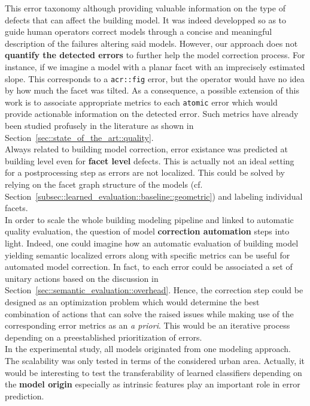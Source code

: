     This error taxonomy although providing valuable information on the type of defects that can affect the building model.
    It was indeed developped so as to guide human operators correct models through a concise and meaningful description of the failures altering said models.
    However, our approach does not \textbf{quantify the detected errors} to further help the model correction process.
    For instance, if we imagine a model with a planar facet with an imprecisely estimated slope.
    This corresponds to a \texttt{\acrfull{acr::fig}} error, but the operator would have no idea by how much the facet was tilted.
    As a consequence, a possible extension of this work is to associate appropriate metrics to each \texttt{atomic} error which would provide actionable information on the detected error.
    Such metrics have already been studied profusely in the literature as shown in Section~\ref{sec::state_of_the_art::quality}.\\

    Always related to building model correction, error existance was predicted at building level even for \textbf{facet level} defects.
    This is actually not an ideal setting for a postprocessing step as errors are not localized.
    This could be solved by relying on the facet graph structure of the models (cf. Section~\ref{subsec::learned_evaluation::baseline::geometric}) and labeling individual facets.\\

    In order to scale the whole building modeling pipeline and linked to automatic quality evaluation, the question of model \textbf{correction automation} steps into light.
    Indeed, one could imagine how an automatic evaluation of building model yielding semantic localized errors along with specific metrics can be useful for automated model correction.
    In fact, to each error could be associated a set of unitary actions based on the discussion in Section~\ref{sec::semantic_evaluation::overhead}.
    Hence, the correction step could be designed as an optimization problem which would determine the best combination of actions that can solve the raised issues while making use of the corresponding error metrics as an \textit{a priori}.
    This would be an iterative process depending on a preestablished prioritization of errors.\\
    
    In the experimental study, all models originated from one modeling approach.
    The scalability was only tested in terms of the considered urban area.
    Actually, it would be interesting to test the transferability of learned classifiers depending on the \textbf{model origin} especially as intrinsic features play an important role in error prediction.\\

